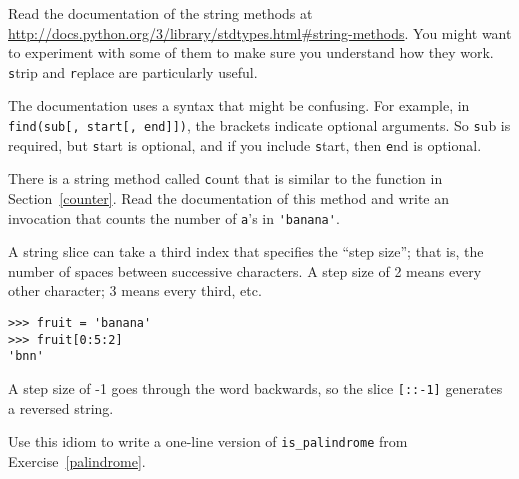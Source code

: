 \documentclass[
DIV=11,
fontsize=13,
twoside,
headinclude=false,
titlepage=firstiscover,
abstract=true,
headsepline=true,
footsepline=true,
chapterprefix=true, %
headings=big,
bibliography=totoc,%
captions=tableheading
]{scrbook}
\theoremstyle{definition}
\begin{document}
\begin{exercise}
\normalfont
{}

Read the documentation of the string methods at
\url{http://docs.python.org/3/library/stdtypes.html#string-methods}.
You might want to experiment with some of them to make sure you
understand how they work.  {\texttt strip} and {\texttt replace} are
particularly useful.

The documentation uses a syntax that might be confusing.
For example, in \verb"find(sub[, start[, end]])", the brackets
indicate optional arguments.  So {\texttt sub} is required, but
{\texttt start} is optional, and if you include {\texttt start},
then {\texttt end} is optional.

\end{exercise}


\begin{exercise}
\normalfont
{}

There is a string method called {\texttt count} that is similar
to the function in Section~\ref{counter}.  Read the documentation
of this method
and write an invocation that counts the number of {\texttt a}'s
in \verb"'banana'".
\end{exercise}


\begin{exercise}
\normalfont
{}

A string slice can take a third index that specifies the ``step
size''; that is, the number of spaces between successive characters.
A step size of 2 means every other character; 3 means every third,
etc.

\begin{lstlisting}
>>> fruit = 'banana'
>>> fruit[0:5:2]
'bnn'
\end{lstlisting}

A step size of -1 goes through the word backwards, so
the slice \verb"[::-1]" generates a reversed string.

Use this idiom to write a one-line version of \verb"is_palindrome"
from Exercise~\ref{palindrome}.
\end{exercise}
\end{document}
